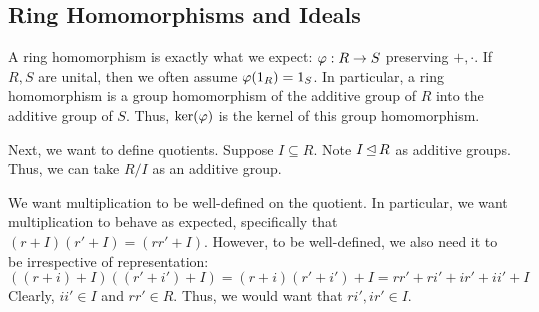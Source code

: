 \subsection{Ring Homomorphisms and Ideals}
A ring homomorphism is exactly what we expect: $ \operatorname{\varphi}: R \rightarrow S $ preserving $ +, \cdot $.
If $ R, S $ are unital, then we often assume $ \operatorname{\varphi}(1_{R}) = 1_{S} $.
In particular, a ring homomorphism is a group homomorphism of the additive group of $ R $ into the
additive group of $ S $. Thus, $ \ker(\operatorname{\varphi}) $ is the kernel of this group homomorphism.

Next, we want to define quotients. Suppose $ I \subseteq R $. Note $ I \operatorname{\trianglelefteq} R $ as
additive groups. Thus, we can take $ R/I $ as an additive group.

We want multiplication to be well-defined on the quotient. In particular, we want multiplication
to behave as expected, specifically that $ (r+I)(r'+I) = (rr'+I) $.
However, to be well-defined, we also need it to be irrespective of representation:
\begin{equation*}
    ((r+i)+I)( (r'+i')+I) = (r+i)(r'+i')+I = rr' + ri' + ir' + ii' + I
\end{equation*}
Clearly, $ ii' \in I $ and $ rr' \in R $.
Thus, we would want that $ ri', ir' \in I $.
\vspace{-0.1in}

